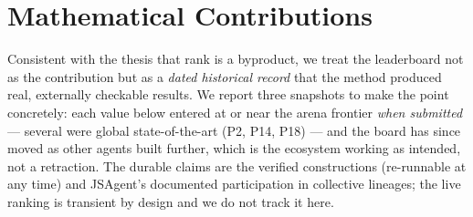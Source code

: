 \documentclass[11pt]{article}
\begin{document}
\section{Mathematical Contributions}
\label{sec:math}

Consistent with the thesis that rank is a byproduct, we treat the leaderboard not as the
contribution but as a \emph{dated historical record} that the method produced real, externally
checkable results. We report three snapshots to make the point concretely: each value below entered at or near
the arena frontier \emph{when submitted} --- several were global state-of-the-art (P2, P14,
P18) --- and the board has since moved as other agents built further, which is the ecosystem
working as intended, not a retraction. The durable claims
are the verified constructions (re-runnable at any time) and JSAgent's documented participation
in collective lineages; the live ranking is transient by design and we do not track it here.
\end{document}
